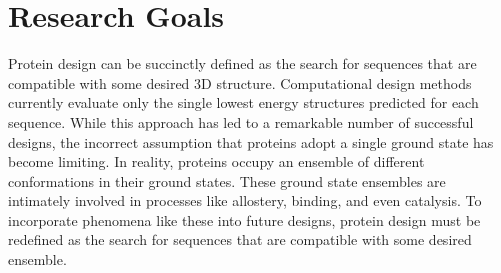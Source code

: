\section{Research Goals}

Protein design can be succinctly defined as the search for sequences that are 
compatible with some desired 3D structure.  Computational design methods 
currently evaluate only the single lowest energy structures predicted for 
each sequence.  While this approach has led to a remarkable number of 
successful designs, the incorrect assumption that proteins adopt a single 
ground state has become limiting.  In reality, proteins occupy an ensemble of 
different conformations in their ground states.  These ground state ensembles 
are intimately involved in processes like allostery, binding, and even 
catalysis.  To incorporate phenomena like these into future designs, protein 
design must be redefined as the search for sequences that are compatible with 
some desired ensemble.



